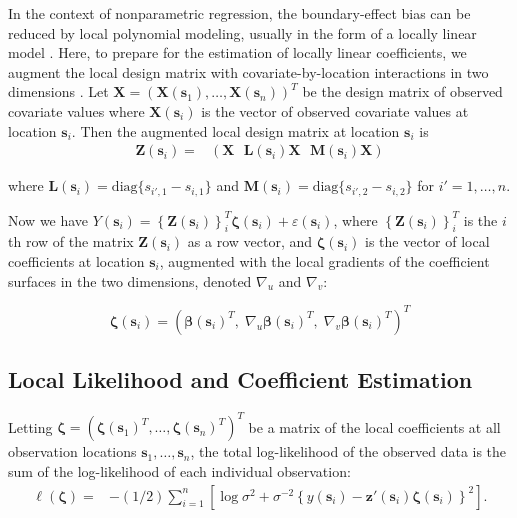 \documentclass[authoryear,review, 12pt]{elsarticle}
\begin{document}
In the context of nonparametric regression, the boundary-effect bias
can be reduced by local polynomial modeling, usually in the form of
a locally linear model \citep{Fan-Gijbels-1996}. Here, to prepare
for the estimation of locally linear coefficients, we augment the
local design matrix with covariate-by-location interactions in two
dimensions \citep{Wang-2008b}. Let $\bm{X}=\left(\bm{X}\left(\bm{s}_{1}\right),\dots,\bm{X}\left(\bm{s}_{n}\right)\right)^{T}$
be the design matrix of observed covariate values where $\bm{X}\left(\bm{s}_{i}\right)$
is the vector of observed covariate values at location $\bm{s}_{i}$.
Then the augmented local design matrix at location $\bm{s}_{i}$ is
\begin{align}
\bm{Z}(\bm{s}_{i})= & \left(\bm{X}\ \:\:\bm{L}\left(\bm{s}_{i}\right)\bm{X}\ \:\:\bm{M}\left(\bm{s}_{i}\right)\bm{X}\right)\label{eq:augmented-covariates}
\end{align}


where $\bm{L}\left(\bm{s}_{i}\right)=\text{diag}\{s_{i',1}-s_{i,1}\}$
and $\bm{M}\left(\bm{s}_{i}\right)=\text{diag}\{s_{i',2}-s_{i,2}\}$
for $i'=1,\dots,n$.

Now we have $Y(\bm{s}_{i})=\left\{ \bm{Z}(\bm{s}_{i})\right\} _{i}^{T}\bm{\zeta}(\bm{s}_{i})+\varepsilon(\bm{s}_{i})$,
where $\left\{ \bm{Z}(\bm{s}_{i})\right\} _{i}^{T}$ is the $i$th
row of the matrix $\bm{Z}(\bm{s}_{i})$ as a row vector, and $\bm{\zeta}(\bm{s}_{i})$
is the vector of local coefficients at location $\bm{s}_{i}$, augmented
with the local gradients of the coefficient surfaces in the two dimensions,
denoted $\nabla_{u}$ and $\nabla_{v}$:

\begin{equation}
\bm{\zeta}(\bm{s}_{i})=\left(\bm{\beta}(\bm{s}_{i})^{T},\;\nabla_{u}\bm{\beta}(\bm{s}_{i})^{T},\;\nabla_{v}\bm{\beta}(\bm{s}_{i})^{T}\right)^{T}\label{eq:augmented-coefficients}
\end{equation}



\subsection{Local Likelihood and Coefficient Estimation}

Letting $\bm{\zeta}=\left(\bm{\zeta}\left(\bm{s}_{1}\right)^{T},\dots,\bm{\zeta}\left(\bm{s}_{n}\right)^{T}\right)^{T}$
be a matrix of the local coefficients at all observation locations
$\bm{s}_{1},\dots,\bm{s}_{n}$, the total log-likelihood of the observed
data is the sum of the log-likelihood of each individual observation:
\begin{align}
\ell\left(\bm{\zeta}\right)= & -(1/2)\sum_{i=1}^{n}\left[\log{\sigma^{2}}+\sigma^{-2}\left\{ y(\bm{s}_{i})-\bm{z}'(\bm{s}_{i})\bm{\zeta}(\bm{s}_{i})\right\} ^{2}\right].\label{eq:coefficients}
\end{align}
\end{document}

